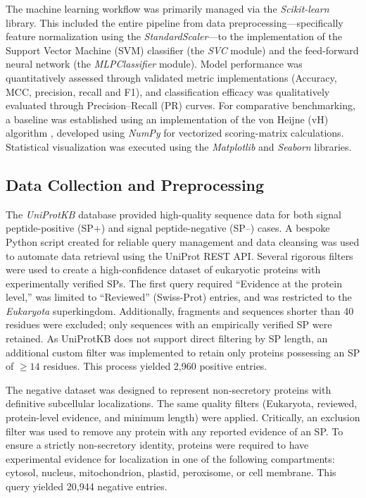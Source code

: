 \documentclass[unnumsec,webpdf,contemporary,large]{oup-authoring-template}
\begin{document}
The machine learning workflow was primarily managed via the \textit{Scikit-learn} library. This included the entire pipeline from data preprocessing---specifically feature normalization using the \textit{StandardScaler}---to the implementation of the Support Vector Machine (SVM) classifier (the \textit{SVC} module) and the feed-forward neural network (the \textit{MLPClassifier} module). Model performance was quantitatively assessed through validated metric implementations (Accuracy, MCC, precision, recall and F1), and classification efficacy was qualitatively evaluated through Precision--Recall (PR) curves. For comparative benchmarking, a baseline was established using an implementation of the von Heijne (vH) algorithm \cite{ref22}, developed using \textit{NumPy} for vectorized scoring-matrix calculations. Statistical visualization was executed using the \textit{Matplotlib} and \textit{Seaborn} libraries.

\subsection{Data Collection and Preprocessing}

The \textit{UniProtKB} database provided high-quality sequence data for both signal peptide-positive (SP+) and signal peptide-negative (SP--) cases. A bespoke Python script created for reliable query management and data cleansing was used to automate data retrieval using the UniProt REST API. Several rigorous filters were used to create a high-confidence dataset of eukaryotic proteins with experimentally verified SPs. The first query required ``Evidence at the protein level,'' was limited to ``Reviewed'' (Swiss-Prot) entries, and was restricted to the \textit{Eukaryota} superkingdom. Additionally, fragments and sequences shorter than 40 residues were excluded; only sequences with an empirically verified SP were retained. As UniProtKB does not support direct filtering by SP length, an additional custom filter was implemented to retain only proteins possessing an SP of $\geq 14$ residues. This process yielded 2{,}960 positive entries.

The negative dataset was designed to represent non-secretory proteins with definitive subcellular localizations. The same quality filters (Eukaryota, reviewed, protein-level evidence, and minimum length) were applied. Critically, an exclusion filter was used to remove any protein with any reported evidence of an SP. To ensure a strictly non-secretory identity, proteins were required to have experimental evidence for localization in one of the following compartments: cytosol, nucleus, mitochondrion, plastid, peroxisome, or cell membrane. This query yielded 20{,}944 negative entries.
\end{document}
